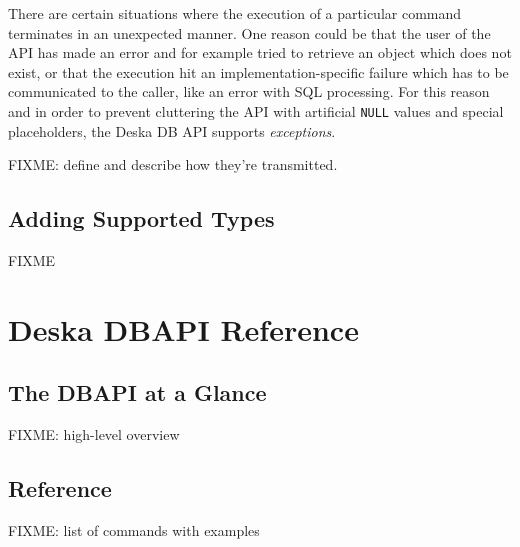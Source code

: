 \documentclass{article}
\begin{document}
There are certain situations where the execution of a particular command terminates in an unexpected manner.  One reason
could be that the user of the API has made an error and for example tried to retrieve an object which does not exist, or
that the execution hit an implementation-specific failure which has to be communicated to the caller, like an error with
SQL processing.  For this reason and in order to prevent cluttering the API with artificial {\tt NULL} values and
special placeholders, the Deska DB API supports {\em exceptions}.

FIXME: define and describe how they're transmitted.

\subsection{Adding Supported Types}
\label{sec:json-extending}

FIXME

\section{Deska DBAPI Reference}

\subsection{The DBAPI at a Glance}

FIXME: high-level overview

\subsection{Reference}

FIXME: list of commands with examples
\end{document}
